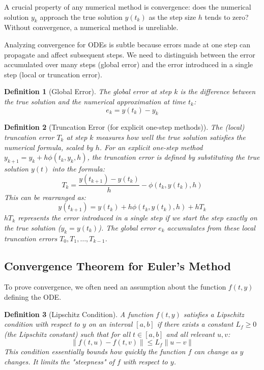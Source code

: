 \documentclass{article}
\newtheorem{definition}{Definition}
\begin{document}
A crucial property of any numerical method is convergence: does the numerical solution $y_k$ approach the true solution $y(t_k)$ as the step size $h$ tends to zero? Without convergence, a numerical method is unreliable.

Analyzing convergence for ODEs is subtle because errors made at one step can propagate and affect subsequent steps. We need to distinguish between the error accumulated over many steps (global error) and the error introduced in a single step (local or truncation error).

\begin{definition}[Global Error]
The global error at step $k$ is the difference between the true solution and the numerical approximation at time $t_k$:
\[
e_k = y(t_k) - y_k
\]
\end{definition}

\begin{definition}[Truncation Error (for explicit one-step methods)]
The (local) truncation error $T_k$ at step $k$ measures how well the true solution satisfies the numerical formula, scaled by $h$. For an explicit one-step method $y_{k+1} = y_k + h \phi(t_k, y_k, h)$, the truncation error is defined by substituting the true solution $y(t)$ into the formula:
\[
T_k = \frac{y(t_{k+1}) - y(t_k)}{h} - \phi(t_k, y(t_k), h)
\]
This can be rearranged as:
\[
y(t_{k+1}) = y(t_k) + h \phi(t_k, y(t_k), h) + h T_k
\]
$h T_k$ represents the error introduced in a single step if we start the step exactly on the true solution ($y_k = y(t_k)$). The global error $e_k$ accumulates from these local truncation errors $T_0, T_1, \dots, T_{k-1}$.
\end{definition}

\subsection{Convergence Theorem for Euler's Method}
To prove convergence, we often need an assumption about the function $f(t, y)$ defining the ODE.

\begin{definition}[Lipschitz Condition]
A function $f(t, y)$ satisfies a Lipschitz condition with respect to $y$ on an interval $[a,b]$ if there exists a constant $L_f \ge 0$ (the Lipschitz constant) such that for all $t \in [a,b]$ and all relevant $u, v$:
\[
\| f(t, u) - f(t, v) \| \le L_f \| u - v \|
\]
This condition essentially bounds how quickly the function $f$ can change as $y$ changes. It limits the "steepness" of $f$ with respect to $y$.
\end{definition}
\end{document}
